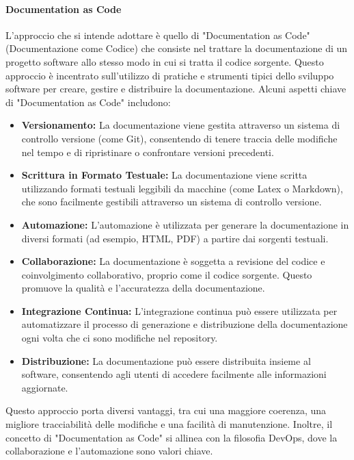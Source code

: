 \documentclass{article}
\begin{document}
    \paragraph{Documentation as Code}
    L'approccio che si intende adottare è quello di "Documentation as Code" (Documentazione come Codice) che consiste nel trattare la documentazione di un progetto software allo stesso modo in cui si tratta il codice sorgente. Questo approccio è incentrato sull'utilizzo di pratiche e strumenti tipici dello sviluppo software per creare, gestire e distribuire la documentazione.
    Alcuni aspetti chiave di "Documentation as Code" includono:
\begin{itemize}
\item \textbf{Versionamento:}
La documentazione viene gestita attraverso un sistema di controllo versione (come Git), consentendo di tenere traccia delle modifiche nel tempo e di ripristinare o confrontare versioni precedenti.

\item \textbf{Scrittura in Formato Testuale:}
La documentazione viene scritta utilizzando formati testuali leggibili da macchine (come Latex o Markdown), che sono facilmente gestibili attraverso un sistema di controllo versione.

\item \textbf{Automazione:}
L'automazione è utilizzata per generare la documentazione in diversi formati (ad esempio, HTML, PDF) a partire dai sorgenti testuali. 

\item \textbf{Collaborazione:}
La documentazione è soggetta a revisione del codice e coinvolgimento collaborativo, proprio come il codice sorgente. Questo promuove la qualità e l'accuratezza della documentazione.

\item \textbf{Integrazione Continua:}
L'integrazione continua può essere utilizzata per automatizzare il processo di generazione e distribuzione della documentazione ogni volta che ci sono modifiche nel repository.

\item \textbf{Distribuzione:}
La documentazione può essere distribuita insieme al software, consentendo agli utenti di accedere facilmente alle informazioni aggiornate.
\end{itemize}
Questo approccio porta diversi vantaggi, tra cui una maggiore coerenza, una migliore tracciabilità delle modifiche e una facilità di manutenzione. Inoltre, il concetto di "Documentation as Code" si allinea con la filosofia DevOps, dove la collaborazione e l'automazione sono valori chiave.\\
\end{document}
